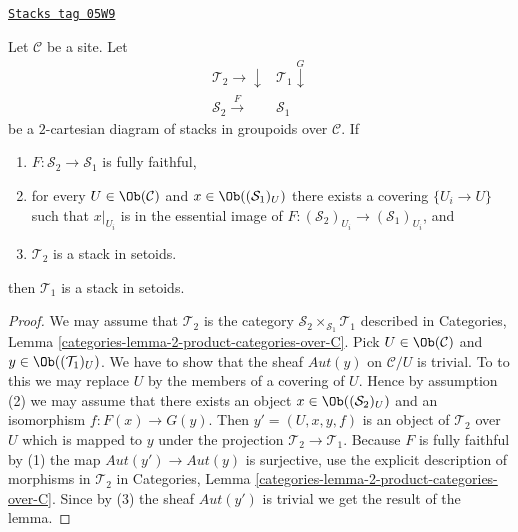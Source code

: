 \begin{lemma}
\label{stacks-lemma-stack-in-setoids-descent}
\href{https://stacks.math.columbia.edu/tag/05W9}{\texttt{Stacks tag 05W9}}

Let $\mathcal{C}$ be a site.
Let
$$
\begin{array}{cc}\mathcal{T}_2 \longrightarrow\downarrow & \mathcal{T}_1 \overset{G}{\downarrow} \\ \mathcal{S}_2 \overset{F}{\longrightarrow} & \mathcal{S}_1\end{array}
$$
be a $2$-cartesian diagram of stacks in groupoids over $\mathcal{C}$.
If
\begin{enumerate}
\item $F : \mathcal{S}_2 \to \mathcal{S}_1$ is fully faithful,
\item for every $U \in \Ob(\mathcal{C})$ and
$x \in \Ob((\mathcal{S}_1)_U)$ there exists a covering
$\{U_i \to U\}$ such that $x|_{U_i}$ is in the essential
image of $F : (\mathcal{S}_2)_{U_i} \to (\mathcal{S}_1)_{U_i}$, and
\item $\mathcal{T}_2$ is a stack in setoids.
\end{enumerate}
then $\mathcal{T}_1$ is a stack in setoids.
\end{lemma}

\begin{proof}
We may assume that $\mathcal{T}_2$ is the category
$\mathcal{S}_2 \times_{\mathcal{S}_1} \mathcal{T}_1$
described in
Categories, Lemma \ref{categories-lemma-2-product-categories-over-C}.
Pick $U \in \Ob(\mathcal{C})$ and
$y \in \Ob((\mathcal{T}_1)_U)$.
We have to show that the sheaf $\mathit{Aut}(y)$ on $\mathcal{C}/U$
is trivial. To to this we may replace $U$ by the members of
a covering of $U$. Hence by assumption (2) we may assume that
there exists an object $x \in \Ob((\mathcal{S}_2)_U)$
and an isomorphism $f : F(x) \to G(y)$.
Then $y' = (U, x, y, f)$ is an object of $\mathcal{T}_2$ over $U$
which is mapped to $y$ under the projection $\mathcal{T}_2 \to \mathcal{T}_1$.
Because $F$ is fully faithful by (1) the map
$\mathit{Aut}(y') \to \mathit{Aut}(y)$ is surjective, use the explicit
description of morphisms in $\mathcal{T}_2$ in
Categories, Lemma \ref{categories-lemma-2-product-categories-over-C}.
Since by (3) the sheaf $\mathit{Aut}(y')$ is trivial
we get the result of the lemma.
\end{proof}

